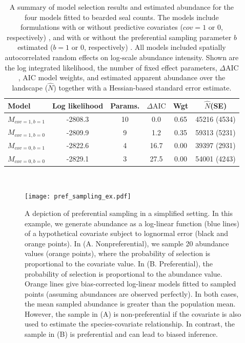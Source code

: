 \documentclass[times,mee,doublespace,]{besauth2}
\begin{document}
\pagebreak
\begin{table}[ht]
\caption{A summary of model selection results and estimated abundance for the four models fitted to bearded seal counts.  The models include formulations with or without predictive covariates ($cov=1$ or 0, respectively) , and with or without the preferential sampling parameter $b$ estimated ($b=1$ or 0, respectively) .  All models included spatially autocorrelated random effects on log-scale abundance intensity.  Shown are the log integrated likelihood, the number of fixed effect parameters, $\Delta \textrm{AIC}$, AIC model weights, and estimated apparent abundance over the landscape ($\hat{N}$) together with a Hessian-based standard error estimate.
}
\label{tab:aic}
\raggedright
\begin{tabular}{lccccc}
  \hline
  Model & Log likelihood & Params. & $\Delta \textrm{AIC}$ & Wgt & $\hat{N}$(SE) \\
  \hline
 $M_{cov=1,b=1}$ & -2808.3 & 10 & 0.0 & 0.65 & 45216 (4534) \\
 $M_{cov=1,b=0}$ & -2809.9 & 9 &  1.2 & 0.35 & 59313 (5231)  \\
 $M_{cov=0,b=1}$ & -2822.6 & 4 & 16.7 & 0.00 & 39397 (2931) \\
 $M_{cov=0,b=0}$ & -2829.1 & 3 & 27.5 & 0.00 & 54001 (4243)\\
 \hline
\end{tabular}
\\
\end{table}

\pagebreak

\begin{figure}
\begin{center}
\texttt{[image: pref\_sampling\_ex.pdf]}
\caption{A depiction of preferential sampling in a simplified setting. In this example, we generate abundance as a log-linear function (blue lines) of a hypothetical covariate subject to lognormal error (black and orange points).  In (A. Nonpreferential), we sample 20 abundance values (orange points), where the probability of selection is proportional to the covariate value. In (B. Preferential), the probability of selection is proportional to the abundance value. Orange lines give bias-corrected log-linear models fitted to sampled points (assuming abundances are observed perfectly).  In both cases, the mean sampled abundance is greater than the population mean. However, the sample in (A) is non-preferential if the covariate is also used to estimate the species-covariate relationship.  In contrast, the sample in (B) is preferential and can lead to biased inference.}
\label{fig:PS_example}
\end{center}
\end{figure}
\end{document}
